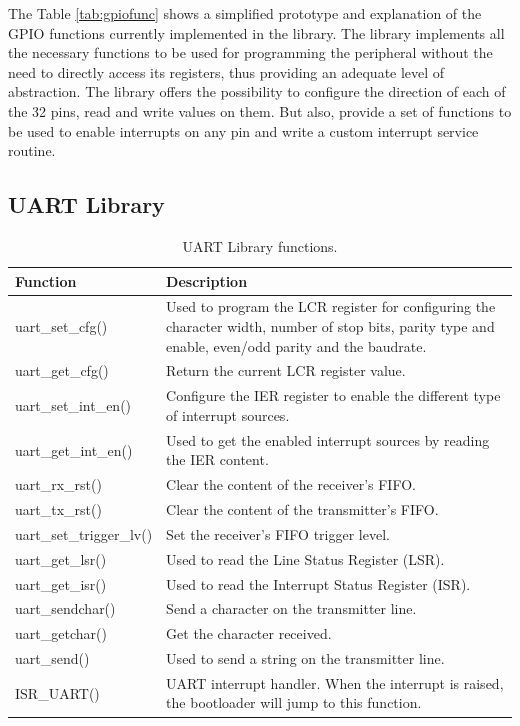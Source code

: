 The Table \ref{tab:gpiofunc} shows a simplified prototype and explanation of the GPIO functions currently implemented in the library. The library implements all the necessary functions to be used for programming the peripheral without the need to directly access its registers, thus providing an adequate level of abstraction. The library offers the possibility to configure the direction of each of the 32 pins, read and write values on them. But also, provide a set of functions to be used to enable interrupts on any pin and write a custom interrupt service routine.

\subsection{UART Library}
\begin{table}
\centering
\begin{tabular}{| p{4cm} | p{7cm} |}
    \hline
    \textbf{Function} & \textbf{Description}\\ \hline
    uart\_set\_cfg() &  Used to program the LCR register for configuring the character width, number of stop bits, parity type and enable, even/odd parity and the baudrate.  \\ \hline
    uart\_get\_cfg() &  Return the current LCR register value.\\ \hline
    uart\_set\_int\_en() &  Configure the IER register to enable the different type of interrupt sources. \\ \hline
    uart\_get\_int\_en() &  Used to get the enabled interrupt sources by reading the IER content.\\ \hline
    uart\_rx\_rst() &  Clear the content of the receiver's FIFO.\\ \hline
    uart\_tx\_rst() &  Clear the content of the transmitter's FIFO.\\ \hline
    uart\_set\_trigger\_lv() & Set the receiver's FIFO trigger level.  \\ \hline
    uart\_get\_lsr() &  Used to read the Line Status Register (LSR). \\ \hline
    uart\_get\_isr() &  Used to read the Interrupt Status Register (ISR). \\ \hline
    uart\_sendchar() & Send a character on the transmitter line. \\ \hline
    uart\_getchar() &   Get the character received. \\ \hline
    uart\_send() &  Used to send a string on the transmitter line.\\ \hline
    ISR\_UART() &  UART interrupt handler. When the interrupt is raised, the bootloader will jump to this function. \\ \hline
    \hline
\end{tabular}
\caption{UART Library functions.}
\label{tab:uartfunc} %
\end{table}

